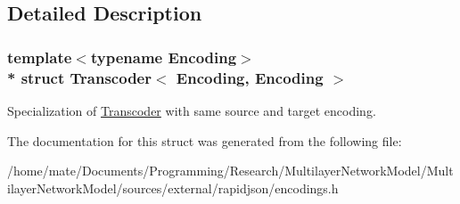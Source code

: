 \subsection{Detailed Description}
\subsubsection*{template$<$typename Encoding$>$\\*
struct Transcoder$<$ Encoding, Encoding $>$}

Specialization of \hyperlink{structTranscoder}{Transcoder} with same source and target encoding. 

The documentation for this struct was generated from the following file\+:\begin{DoxyCompactItemize}
\item 
/home/mate/\+Documents/\+Programming/\+Research/\+Multilayer\+Network\+Model/\+Multilayer\+Network\+Model/sources/external/rapidjson/encodings.\+h\end{DoxyCompactItemize}
